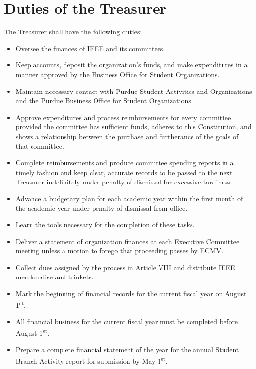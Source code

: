 \documentclass[12pt]{constitution}
\newcommand{\dateannualreportsubmit}{May 1\textsuperscript{st}} %
\newcommand{\datefiscalstart}{August 1\textsuperscript{st}} %
\begin{document}
\section{Duties of the Treasurer}
\label{sec:officer_treas}
The Treasurer shall have the following duties:
\begin{itemize}
    \item Oversee the finances of IEEE and its committees.
    \item Keep accounts, deposit the organization’s funds, and make expenditures in a manner approved by the Business Office for Student Organizations.
    \item Maintain necessary contact with Purdue Student Activities and Organizations and the Purdue Business Office for Student Organizations.
    \item Approve expenditures and process reimbursements for every committee provided the committee has sufficient funds, adheres to this Constitution, and shows a relationship between the purchase and furtherance of the goals of that committee.
    \item Complete reimbursements and produce committee spending reports in a timely fashion and keep clear, accurate records to be passed to the next Treasurer indefinitely under penalty of dismissal for excessive tardiness.
    \item Advance a budgetary plan for each academic year within the first month of the academic year under penalty of dismissal from office.
    \item Learn the tools necessary for the completion of these tasks.
    \item Deliver a statement of organization finances at each Executive Committee meeting unless a motion to forego that proceeding passes by ECMV.
    \item Collect dues assigned by the process in Article VIII and distribute IEEE merchandise and trinkets.
    \item Mark the beginning of financial records for the current fiscal year on \datefiscalstart{}.
    \item All financial business for the current fiscal year must be completed before \datefiscalstart{}.
    \item Prepare a complete financial statement of the year for the annual Student Branch Activity report for submission by \dateannualreportsubmit{}.
\end{itemize}
\end{document}
